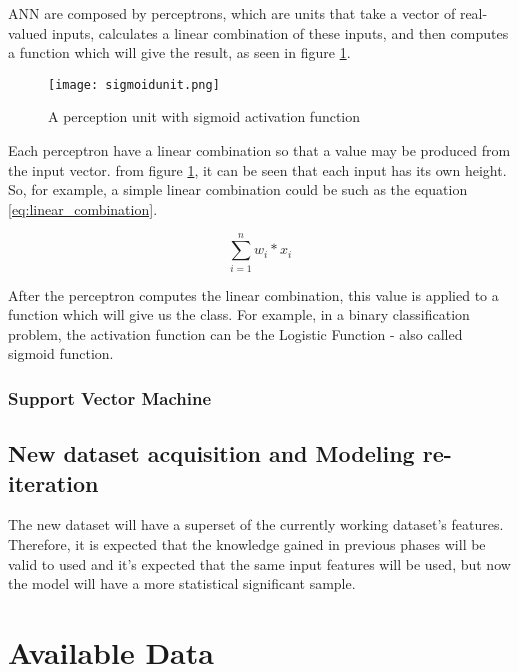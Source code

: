 ANN are composed by perceptrons, which are units that take a vector of real-valued inputs, calculates a linear combination of these inputs, and then computes a function which will give the result, as seen in figure \ref{fig:sigmoid_unit}.

\begin{figure}[htpb]
\centering
\texttt{[image: sigmoidunit.png]}
\caption{A perception unit with sigmoid activation function}
\label{fig:sigmoid_unit}
\end{figure}

Each perceptron have a linear combination so that a value may be produced from the input vector. from figure \ref{fig:sigmoid_unit}, it can be seen that each input has its own height. So, for example, a simple linear combination could be such as the equation \ref{eq:linear_combination}.

\begin{equation} 
\label{eq:linear_combination}
\sum_{i=1}^{n} w_{i}*x_{i}
\end{equation}

After the perceptron computes the linear combination, this value is applied to a function which will give us the class. For example, in a binary classification problem, the activation function can be the Logistic Function - also called sigmoid function.

\subsubsection{Support Vector Machine}

\subsection{New dataset acquisition and Modeling re-iteration}
The new dataset will have a superset of the currently working dataset's features. Therefore, it is expected that the knowledge gained in previous phases will be valid to used and it's expected that the same input features will be used, but now the model will have a more statistical significant sample.
\label{subsec:reiteration}


\section{Available Data}
\label{sec:available_data}
